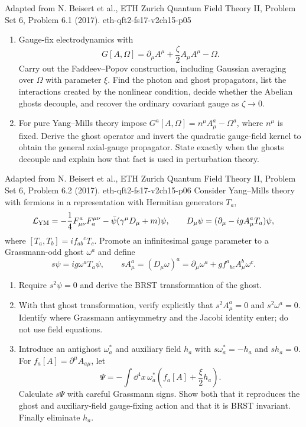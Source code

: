 \begin{enumerate}
  {Adapted from N. Beisert et al., ETH Zurich Quantum Field Theory II, Problem Set 6, Problem 6.1 (2017).}
  {eth-qft2-fs17-v2ch15-p05}
  \begin{enumerate}
    \item[(a)] Gauge-fix electrodynamics with
    \[
      G[A,\Omega]=\partial_\mu A^\mu+\frac{\zeta}{2}A_\mu A^\mu-\Omega .
    \]
      Carry out the Faddeev--Popov construction, including Gaussian
      averaging over \(\Omega\) with parameter \(\xi\).  Find the photon and
      ghost propagators, list the interactions created by the nonlinear
      condition, decide whether the Abelian ghosts decouple, and recover the
      ordinary covariant gauge as \(\zeta\to0\).
    \item[(b)] For pure Yang--Mills theory impose
      \(G^a[A,\Omega]=n^\mu A^a_\mu-\Omega^a\), where \(n^\mu\) is fixed.
      Derive the ghost operator and invert the quadratic gauge-field kernel
      to obtain the general axial-gauge propagator.  State exactly when the
      ghosts decouple and explain how that fact is used in perturbation
      theory.
  \end{enumerate}

  {Adapted from N. Beisert et al., ETH Zurich Quantum Field Theory II, Problem Set 6, Problem 6.2 (2017).}
  {eth-qft2-fs17-v2ch15-p06}
  Consider Yang--Mills theory with fermions in a representation with
  Hermitian generators \(T_a\),
  \[
    \mathcal L_{\rm YM}
      =-\frac14F^a_{\mu\nu}F_a^{\mu\nu}
       -\bar\psi(\gamma^\mu D_\mu+m)\psi,
    \qquad
    D_\mu\psi=(\partial_\mu-igA^a_\mu T_a)\psi,
  \]
  where \([T_a,T_b]=if_{ab}{}^cT_c\).  Promote an infinitesimal gauge
  parameter to a Grassmann-odd ghost \(\omega^a\) and define
  \[
    s\psi=ig\omega^aT_a\psi,
    \qquad
    sA^a_\mu=(D_\mu\omega)^a
      =\partial_\mu\omega^a+gf^a{}_{bc}A^b_\mu\omega^c.
  \]
  \begin{enumerate}
    \item[(a)]
    Require \(s^2\psi=0\) and derive the BRST transformation of the ghost.
    \item[(b)]
    With that ghost transformation, verify explicitly that
    \(s^2A^a_\mu=0\) and \(s^2\omega^a=0\).  Identify where Grassmann
    antisymmetry and the Jacobi identity enter; do not use field equations.
    \item[(c)]
    Introduce an antighost \(\omega_a^*\) and auxiliary field \(h_a\) with
    \(s\omega_a^*=-h_a\) and \(sh_a=0\).  For
    \(f_a[A]=\partial^\mu A_{a\mu}\), let
    \[
      \Psi=-\int \dd^4x\,\omega_a^*
        \left(f_a[A]+\frac{\xi}{2}h_a\right).
    \]
    Calculate \(s\Psi\) with careful Grassmann signs.  Show both that it
    reproduces the ghost and auxiliary-field gauge-fixing action and that it
    is BRST invariant.  Finally eliminate \(h_a\).
  \end{enumerate}


\end{enumerate}
